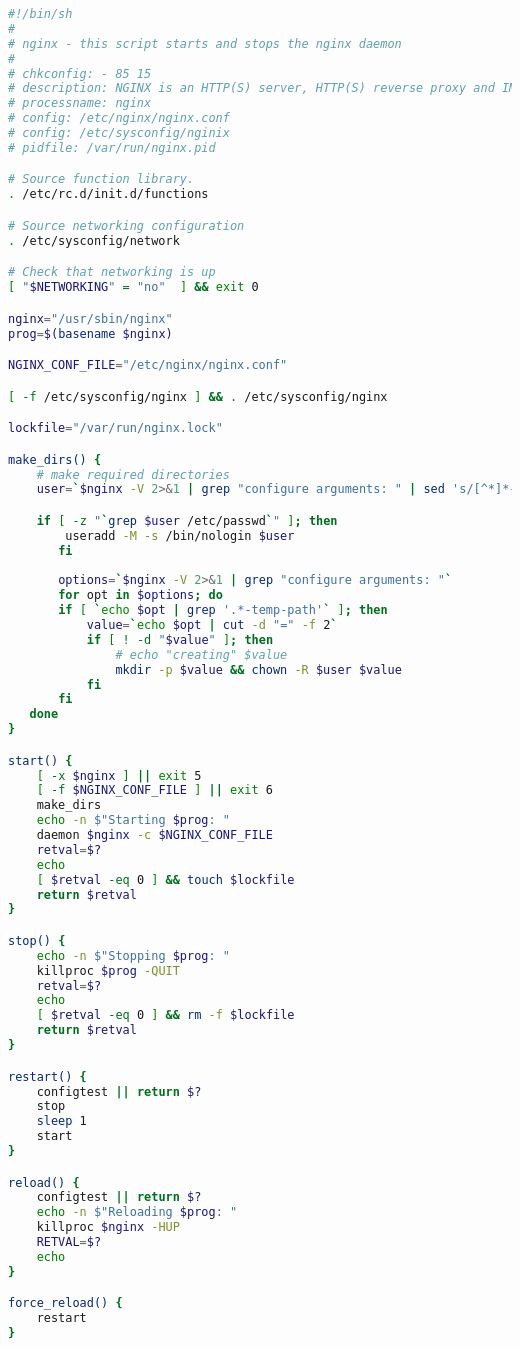 \begin{lstlisting}[language=bash]
#!/bin/sh
#
# nginx - this script starts and stops the nginx daemon
#
# chkconfig: - 85 15
# description: NGINX is an HTTP(S) server, HTTP(S) reverse proxy and IMAP/POP3 proxy server
# processname: nginx
# config: /etc/nginx/nginx.conf
# config: /etc/sysconfig/nginix
# pidfile: /var/run/nginx.pid

# Source function library.
. /etc/rc.d/init.d/functions

# Source networking configuration
. /etc/sysconfig/network

# Check that networking is up
[ "$NETWORKING" = "no"  ] && exit 0

nginx="/usr/sbin/nginx"
prog=$(basename $nginx)

NGINX_CONF_FILE="/etc/nginx/nginx.conf"

[ -f /etc/sysconfig/nginx ] && . /etc/sysconfig/nginx

lockfile="/var/run/nginx.lock"

make_dirs() {
	# make required directories
	user=`$nginx -V 2>&1 | grep "configure arguments: " | sed 's/[^*]*--user=\([^ ]*\).*/\1/g' -`

	if [ -z "`grep $user /etc/passwd`" ]; then
       	useradd -M -s /bin/nologin $user
       fi
       
       options=`$nginx -V 2>&1 | grep "configure arguments: "`
       for opt in $options; do
       if [ `echo $opt | grep '.*-temp-path'` ]; then
           value=`echo $opt | cut -d "=" -f 2`
           if [ ! -d "$value" ]; then
               # echo "creating" $value
               mkdir -p $value && chown -R $user $value
           fi
       fi
   done
}

start() {
    [ -x $nginx ] || exit 5
    [ -f $NGINX_CONF_FILE ] || exit 6
    make_dirs
    echo -n $"Starting $prog: "
    daemon $nginx -c $NGINX_CONF_FILE
    retval=$?
    echo
    [ $retval -eq 0 ] && touch $lockfile
    return $retval
}

stop() {
    echo -n $"Stopping $prog: "
    killproc $prog -QUIT
    retval=$?
    echo
    [ $retval -eq 0 ] && rm -f $lockfile
    return $retval
}

restart() {
    configtest || return $?
    stop
    sleep 1
    start
}

reload() {
    configtest || return $?
    echo -n $"Reloading $prog: "
    killproc $nginx -HUP
    RETVAL=$?
    echo
}

force_reload() {
    restart
}


\end{lstlisting}
